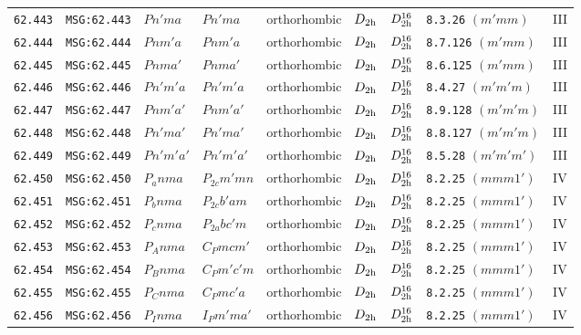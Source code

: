 \documentclass[fleqn,10pt]{jsarticle}
\begin{document}
\begin{center}
\begin{longtable}{lllllllll}
\texttt{62.443} & \texttt{MSG:62.443} & $Pn'ma$ & $Pn'ma$ & orthorhombic & $D_{\rm 2h}$ & $D_{\rm 2h}^{16}$ & \texttt{8.3.26} $(m'mm)$ & III \\
\texttt{62.444} & \texttt{MSG:62.444} & $Pnm'a$ & $Pnm'a$ & orthorhombic & $D_{\rm 2h}$ & $D_{\rm 2h}^{16}$ & \texttt{8.7.126} $(m'mm)$ & III \\
\texttt{62.445} & \texttt{MSG:62.445} & $Pnma'$ & $Pnma'$ & orthorhombic & $D_{\rm 2h}$ & $D_{\rm 2h}^{16}$ & \texttt{8.6.125} $(m'mm)$ & III \\
\texttt{62.446} & \texttt{MSG:62.446} & $Pn'm'a$ & $Pn'm'a$ & orthorhombic & $D_{\rm 2h}$ & $D_{\rm 2h}^{16}$ & \texttt{8.4.27} $(m'm'm)$ & III \\
\texttt{62.447} & \texttt{MSG:62.447} & $Pnm'a'$ & $Pnm'a'$ & orthorhombic & $D_{\rm 2h}$ & $D_{\rm 2h}^{16}$ & \texttt{8.9.128} $(m'm'm)$ & III \\
\texttt{62.448} & \texttt{MSG:62.448} & $Pn'ma'$ & $Pn'ma'$ & orthorhombic & $D_{\rm 2h}$ & $D_{\rm 2h}^{16}$ & \texttt{8.8.127} $(m'm'm)$ & III \\
\texttt{62.449} & \texttt{MSG:62.449} & $Pn'm'a'$ & $Pn'm'a'$ & orthorhombic & $D_{\rm 2h}$ & $D_{\rm 2h}^{16}$ & \texttt{8.5.28} $(m'm'm')$ & III \\
\texttt{62.450} & \texttt{MSG:62.450} & $P_{a}nma$ & $P_{2c}m'mn$ & orthorhombic & $D_{\rm 2h}$ & $D_{\rm 2h}^{16}$ & \texttt{8.2.25} $(mmm1')$ & IV \\
\texttt{62.451} & \texttt{MSG:62.451} & $P_{b}nma$ & $P_{2c}b'am$ & orthorhombic & $D_{\rm 2h}$ & $D_{\rm 2h}^{16}$ & \texttt{8.2.25} $(mmm1')$ & IV \\
\texttt{62.452} & \texttt{MSG:62.452} & $P_{c}nma$ & $P_{2a}bc'm$ & orthorhombic & $D_{\rm 2h}$ & $D_{\rm 2h}^{16}$ & \texttt{8.2.25} $(mmm1')$ & IV \\
\texttt{62.453} & \texttt{MSG:62.453} & $P_{A}nma$ & $C_{P}mcm'$ & orthorhombic & $D_{\rm 2h}$ & $D_{\rm 2h}^{16}$ & \texttt{8.2.25} $(mmm1')$ & IV \\
\texttt{62.454} & \texttt{MSG:62.454} & $P_{B}nma$ & $C_{P}m'c'm$ & orthorhombic & $D_{\rm 2h}$ & $D_{\rm 2h}^{16}$ & \texttt{8.2.25} $(mmm1')$ & IV \\
\texttt{62.455} & \texttt{MSG:62.455} & $P_{C}nma$ & $C_{P}mc'a$ & orthorhombic & $D_{\rm 2h}$ & $D_{\rm 2h}^{16}$ & \texttt{8.2.25} $(mmm1')$ & IV \\
\texttt{62.456} & \texttt{MSG:62.456} & $P_{I}nma$ & $I_{P}m'ma'$ & orthorhombic & $D_{\rm 2h}$ & $D_{\rm 2h}^{16}$ & \texttt{8.2.25} $(mmm1')$ & IV \\ \hline

\end{longtable}
\end{center}
\end{document}
